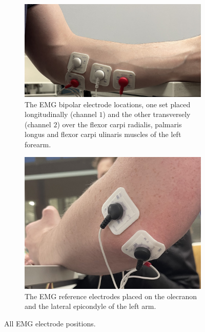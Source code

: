\begin{figure}
	\centering
	\begin{subfigure}[b]{0.45\columnwidth}
		\centering
		\includegraphics[width=\columnwidth]{figures/emg_electrodes.jpg}
		\caption{The EMG bipolar electrode locations, one set placed longitudinally (channel $1$) and the other transversely (channel $2$) over the flexor carpi radialis, palmaris longus and flexor carpi ulinaris muscles of the left forearm.}
		\label{fig:emg_electrodes}
	\end{subfigure}
	\begin{subfigure}[b]{0.45\columnwidth}
		\centering
		\includegraphics[width=\columnwidth]{figures/emg_reference.jpg}
		\caption{The EMG reference electrodes placed on the olecranon and the lateral epicondyle of the left arm.}
		\label{fig:emg_reference}
	\end{subfigure}
    \hfill
	\caption{All EMG electrode positions.}
	\label{fig:emg_positions}
\end{figure}

